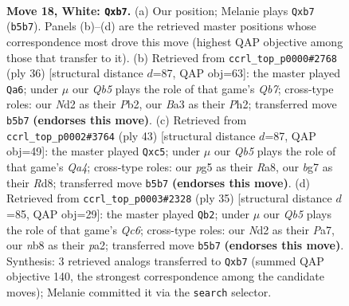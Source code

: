 \documentclass[11pt]{article}
\begin{document}
\clearpage

\begin{figure}[p]\centering
\begin{subfigure}{0.46\textwidth}\centering
\resizebox{\linewidth}{!}{%
\newchessgame
\chessboard[
  setfen={rn1q2kr/1b4b1/4p3/pQ4pp/3P4/B7/P2N1PPP/R4RK1 w - - 0 18},
  showmover=false,
  pgfstyle=straightmove, color=movearrow, markmove={b5-b7}
]}
\caption{}
\end{subfigure}\hfill
\begin{subfigure}{0.46\textwidth}\centering
\resizebox{\linewidth}{!}{%
\newchessgame
\chessboard[
  setfen={3r1r2/pQ3ppk/3Nb3/4p1q1/8/8/PP3PPP/R4RK1 w - - 1 19},
  showmover=false,
  pgfstyle=straightmove, color=movearrow, markmove={b7-a6}
]}
\caption{}
\end{subfigure}
\\[4pt]
\begin{subfigure}{0.46\textwidth}\centering
\resizebox{\linewidth}{!}{%
\newchessgame
\chessboard[
  setfen={r2r2k1/p4pp1/4pn1p/q1B5/2PN4/7P/P3QPP1/1R1R2K1 b - - 0 22},
  showmover=false,
  pgfstyle=straightmove, color=movearrow, markmove={a5-c5}
]}
\caption{}
\end{subfigure}\hfill
\begin{subfigure}{0.46\textwidth}\centering
\resizebox{\linewidth}{!}{%
\newchessgame
\chessboard[
  setfen={r4rk1/pp1b1p1p/6p1/6Q1/3P4/2qB4/P4PPP/2RR2K1 b - - 1 18},
  showmover=false,
  pgfstyle=straightmove, color=movearrow, markmove={c3-b2}
]}
\caption{}
\end{subfigure}
\caption{\textbf{Move 18, White: \texttt{Qxb7}.} (a) Our position; Melanie plays \texttt{Qxb7} (\texttt{b5b7}). Panels (b)--(d) are the retrieved master positions whose correspondence most drove this move (highest QAP objective among those that transfer to it). (b) Retrieved from \texttt{ccrl\_top\_p0000\#2768} (ply 36) [structural distance $d$=87, QAP obj=63]: the master played \texttt{Qa6}; under $\mu$ our \emph{Qb5} plays the role of that game's \emph{Qb7}; cross-type roles: our \emph{N}d2 as their \emph{P}b2, our \emph{B}a3 as their \emph{P}h2; transferred move \texttt{b5b7} \textbf{(endorses this move)}. (c) Retrieved from \texttt{ccrl\_top\_p0002\#3764} (ply 43) [structural distance $d$=87, QAP obj=49]: the master played \texttt{Qxc5}; under $\mu$ our \emph{Qb5} plays the role of that game's \emph{Qa4}; cross-type roles: our \emph{p}g5 as their \emph{R}a8, our \emph{b}g7 as their \emph{R}d8; transferred move \texttt{b5b7} \textbf{(endorses this move)}. (d) Retrieved from \texttt{ccrl\_top\_p0003\#2328} (ply 35) [structural distance $d$=85, QAP obj=29]: the master played \texttt{Qb2}; under $\mu$ our \emph{Qb5} plays the role of that game's \emph{Qc6}; cross-type roles: our \emph{N}d2 as their \emph{P}a7, our \emph{n}b8 as their \emph{p}a2; transferred move \texttt{b5b7} \textbf{(endorses this move)}. Synthesis: 3 retrieved analogs transferred to \texttt{Qxb7} (summed QAP objective 140, the strongest correspondence among the candidate moves); Melanie committed it via the \texttt{search} selector.}
\label{fig:thought-m34}
\end{figure}
\end{document}
